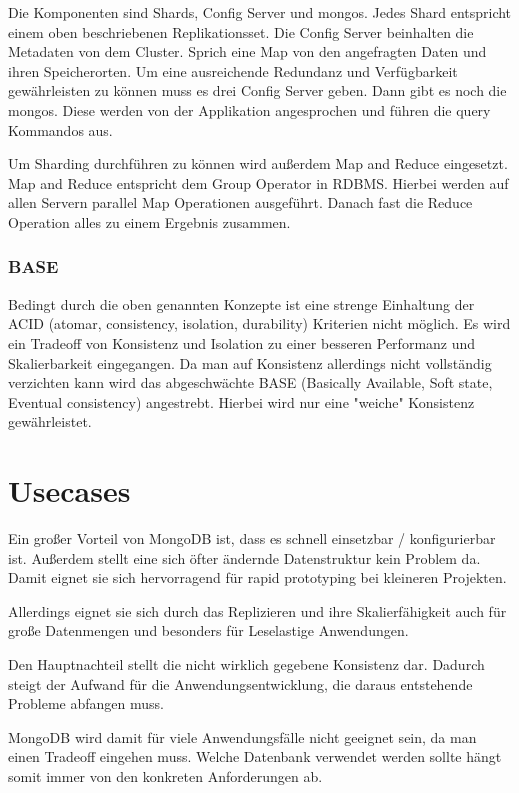 Die Komponenten sind Shards, Config Server und mongos. Jedes Shard entspricht einem oben
beschriebenen Replikationsset. Die Config Server beinhalten die
Metadaten von dem Cluster. Sprich eine Map von den angefragten Daten und
ihren Speicherorten. Um eine ausreichende Redundanz und Verfügbarkeit gewährleisten zu können
muss es drei Config Server geben. Dann gibt es noch die mongos. Diese
werden von der Applikation angesprochen und führen die query Kommandos
aus.

Um Sharding durchführen zu können wird außerdem Map and Reduce eingesetzt. Map and Reduce entspricht dem Group Operator in RDBMS.
Hierbei werden auf allen Servern parallel Map Operationen ausgeführt. Danach fast die Reduce Operation alles zu einem Ergebnis zusammen.

\subsubsection{BASE}
Bedingt durch die oben genannten Konzepte ist eine strenge Einhaltung der ACID (atomar, consistency, isolation, durability) Kriterien nicht möglich. Es wird ein Tradeoff von Konsistenz und Isolation zu einer besseren Performanz und Skalierbarkeit eingegangen. Da man auf Konsistenz allerdings nicht vollständig verzichten kann wird das abgeschwächte BASE (Basically Available, Soft state, Eventual consistency) angestrebt. Hierbei wird nur eine "weiche" Konsistenz gewährleistet.

\section{Usecases}\label{usecases}

Ein großer Vorteil von MongoDB ist, dass es schnell einsetzbar / konfigurierbar ist.
Außerdem stellt eine sich öfter ändernde Datenstruktur kein Problem da.
Damit eignet sie sich hervorragend für rapid prototyping bei kleineren Projekten.

Allerdings eignet sie sich durch das Replizieren und ihre Skalierfähigkeit auch für große Datenmengen
und besonders für Leselastige Anwendungen.

Den Hauptnachteil stellt die nicht wirklich gegebene Konsistenz dar.
Dadurch steigt der Aufwand für die Anwendungsentwicklung, die daraus entstehende Probleme abfangen muss.

MongoDB wird damit für viele Anwendungsfälle nicht geeignet sein, da man einen Tradeoff eingehen muss.
Welche Datenbank verwendet werden sollte hängt somit immer von den konkreten Anforderungen ab.


